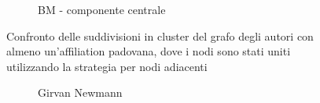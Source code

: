 \documentclass[12pt,a4paper,twoside]{report}
\begin{document}
\begin{figure}[ht]
\begin{subfigure}[b]{0.5\textwidth}
            \caption{BM - componente centrale}
        \end{subfigure}%
    \caption{Confronto delle suddivisioni in cluster del grafo degli autori con almeno un'affiliation
    padovana, dove i nodi sono stati uniti utilizzando la strategia per nodi adiacenti}
    \label{fig:grafipadovaniedge}
\end{figure}

\clearpage
\begin{figure}[ht]
    \centering
        \begin{subfigure}[b]{0.5\textwidth}
            \centering
            \setlength{\fboxrule}{0pt} %
                \caption{Girvan Newmann}
            \end{subfigure}%
            ~
            \begin{subfigure}[b]{0.5\textwidth}
                \centering
                \setlength{\fboxrule}{0pt} %

\end{subfigure}
\end{figure}
\end{document}
